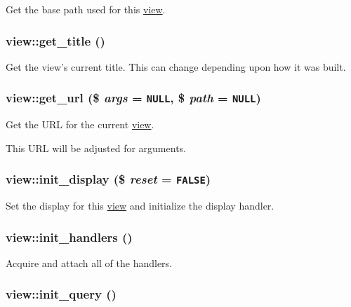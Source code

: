Get the base path used for this \hyperlink{classview}{view}. \hypertarget{classview_d2fe858c2ebd577922413355cd42eb10}{
\subsubsection[{get\_\-title}]{\setlength{\rightskip}{0pt plus 5cm}view::get\_\-title ()}}
\label{classview_d2fe858c2ebd577922413355cd42eb10}


Get the view's current title. This can change depending upon how it was built. \hypertarget{classview_3ed974c9fffd899f1ad371c47e8781e3}{
\subsubsection[{get\_\-url}]{\setlength{\rightskip}{0pt plus 5cm}view::get\_\-url (\$ {\em args} = {\tt NULL}, \/  \$ {\em path} = {\tt NULL})}}
\label{classview_3ed974c9fffd899f1ad371c47e8781e3}


Get the URL for the current \hyperlink{classview}{view}.

This URL will be adjusted for arguments. \hypertarget{classview_5d314e75f3ebe2c46988e9b0c6b9b3b4}{
\subsubsection[{init\_\-display}]{\setlength{\rightskip}{0pt plus 5cm}view::init\_\-display (\$ {\em reset} = {\tt FALSE})}}
\label{classview_5d314e75f3ebe2c46988e9b0c6b9b3b4}


Set the display for this \hyperlink{classview}{view} and initialize the display handler. \hypertarget{classview_8f0b3dc5e14f0d96d37af0050b83ee6b}{
\subsubsection[{init\_\-handlers}]{\setlength{\rightskip}{0pt plus 5cm}view::init\_\-handlers ()}}
\label{classview_8f0b3dc5e14f0d96d37af0050b83ee6b}


Acquire and attach all of the handlers. \hypertarget{classview_f71eca2ca74a696efe9be2b7cd6fee8f}{
\subsubsection[{init\_\-query}]{\setlength{\rightskip}{0pt plus 5cm}view::init\_\-query ()}}
\label{classview_f71eca2ca74a696efe9be2b7cd6fee8f}


